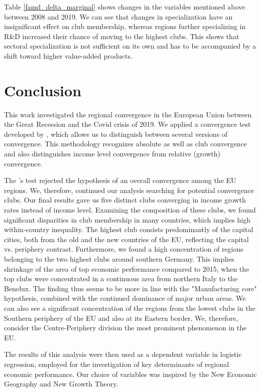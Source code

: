 \documentclass[11pt]{article}
\begin{document}
Table \ref{famd_delta_marginal} shows changes in the variables mentioned above between 2008 and 2019. We can see that changes in specialization have an insignificant effect on club membership, whereas regions further specializing in R\&D increased their chance of moving to the highest clubs. This shows that sectoral specialization is not sufficient on its own and has to be accompanied by a shift toward higher value-added products.

\section{Conclusion}

This work investigated the regional convergence in the European Union between the Great Recession and the Covid crisis of 2019. We applied a convergence test developed by \citet{phillips2009economic}, which allows us to distinguish between several versions of convergence. This methodology recognizes absolute as well as club convergence and also distinguishes income level convergence from relative (growth) convergence.

The \citeauthor{phillips2009economic}'s test rejected the hypothesis of an overall convergence among the EU regions. We, therefore, continued our analysis searching for potential convergence clubs. Our final results gave us five distinct clubs converging in income growth rates instead of income level. Examining the composition of these clubs, we found significant disparities in club membership in many countries, which implies high within-country inequality. The highest club consists predominantly of the capital cities, both from the old and the new countries of the EU, reflecting the capital vs. periphery contrast. Furthermore, we found a high concentration of regions belonging to the two highest clubs around southern Germany. This implies shrinkage of the area of top economic performance compared to 2015, when the top clubs were concentrated in a continuous area from northern Italy to the Benelux. The finding thus seems to be more in line with the "Manufacturing core" hypothesis, combined with the continued dominance of major urban areas. We can also see a significant concentration of the regions from the lowest clubs in the Southern periphery of the EU and also at its Eastern border. We, therefore, consider the Centre-Periphery division the most prominent phenomenon in the EU.

The results of this analysis were then used as a dependent variable in logistic regression, employed for the investigation of key determinants of regional economic performance. Our choice of variables was inspired by the New Economic Geography and New Growth Theory.
\end{document}
